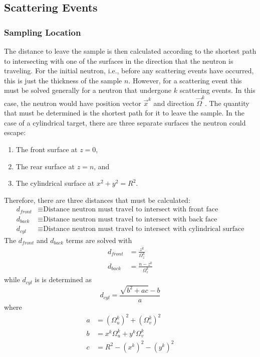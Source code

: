 \subsection{Scattering Events}

\subsubsection{Sampling Location}
\label{sec:sampling-location-ms}
The distance to leave the sample is then calculated according to the shortest path to intersecting with one of the surfaces in the direction that the neutron is traveling. For the initial neutron, i.e., before any scattering events have occurred, this is just the thickness of the sample $n$. However, for a scattering event this must be solved generally for a neutron that undergone $k$ scattering events. In this case, the neutron would have position vector $\overrightarrow{x}^k$ and direction $\overrightarrow{\Omega}^k$. The quantity that must be determined is the shortest path for it to leave the sample. In the case of a cylindrical target, there are three separate surfaces the neutron could escape:
\begin{enumerate}
    \item The front surface at $z=0$,
    \item The rear surface at $z=n$, and
    \item The cylindrical surface at $x^2 + y^2 = R^2$.
\end{enumerate}
Therefore, there are three distances that must be calculated:
\begin{align*}
    d_{front}   &\equiv \text{Distance neutron must travel to intersect with front face} \\
    d_{back}    &\equiv \text{Distance neutron must travel to intersect with back face} \\
    d_{cyl}     &\equiv \text{Distance neutron must travel to intersect with cylindrical surface}
\end{align*}
The $d_{front}$ and $d_{back}$ terms are solved with
\begin{align}
    d_{front} &= \frac{z^k}{\Omega_{z}^{k}} \\
    d_{back} &= \frac{n - z^{k}}{\Omega^{k}_{z}}
\end{align}
while $d_{cyl}$ is is determined as
\begin{equation}
    \label{eq:cyl-intersection-distance}
    d_{cyl} = \frac{\sqrt{b^2 + ac} - b}{a}
\end{equation}
where
\begin{align}
    a &= \left( \Omega_{u}^{k} \right)^2 + \left( \Omega_{v}^{k} \right)^2\\
    b &= x^k \Omega_{u}^{k} + y^k\Omega_{v}^{k} \\
    c &= R^2 - \left( x^k \right)^2 - \left( y^k \right)^2
\end{align}

